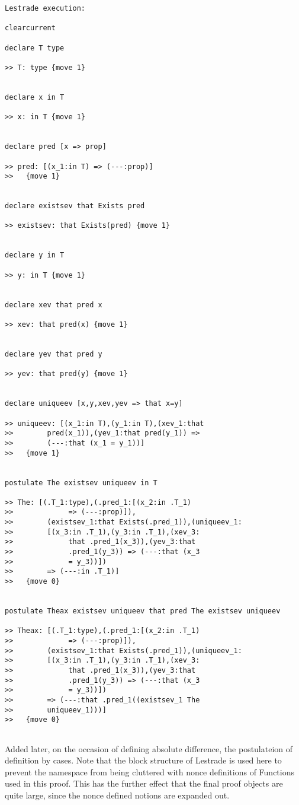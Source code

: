 \documentclass[12pt]{article}
\begin{document}
\begin{verbatim}Lestrade execution:

clearcurrent

declare T type

>> T: type {move 1}


declare x in T

>> x: in T {move 1}


declare pred [x => prop]

>> pred: [(x_1:in T) => (---:prop)]
>>   {move 1}


declare existsev that Exists pred

>> existsev: that Exists(pred) {move 1}


declare y in T

>> y: in T {move 1}


declare xev that pred x

>> xev: that pred(x) {move 1}


declare yev that pred y

>> yev: that pred(y) {move 1}


declare uniqueev [x,y,xev,yev => that x=y]

>> uniqueev: [(x_1:in T),(y_1:in T),(xev_1:that 
>>        pred(x_1)),(yev_1:that pred(y_1)) => 
>>        (---:that (x_1 = y_1))]
>>   {move 1}


postulate The existsev uniqueev in T

>> The: [(.T_1:type),(.pred_1:[(x_2:in .T_1) 
>>             => (---:prop)]),
>>        (existsev_1:that Exists(.pred_1)),(uniqueev_1:
>>        [(x_3:in .T_1),(y_3:in .T_1),(xev_3:
>>             that .pred_1(x_3)),(yev_3:that 
>>             .pred_1(y_3)) => (---:that (x_3 
>>             = y_3))])
>>        => (---:in .T_1)]
>>   {move 0}


postulate Theax existsev uniqueev that pred The existsev uniqueev

>> Theax: [(.T_1:type),(.pred_1:[(x_2:in .T_1) 
>>             => (---:prop)]),
>>        (existsev_1:that Exists(.pred_1)),(uniqueev_1:
>>        [(x_3:in .T_1),(y_3:in .T_1),(xev_3:
>>             that .pred_1(x_3)),(yev_3:that 
>>             .pred_1(y_3)) => (---:that (x_3 
>>             = y_3))])
>>        => (---:that .pred_1((existsev_1 The 
>>        uniqueev_1)))]
>>   {move 0}


\end{verbatim}

Added later, on the occasion of defining absolute difference, the postulateion of definition by cases.  Note that the block structure of Lestrade is used here
to prevent the namespace from being cluttered with nonce definitions of Functions used in this proof.  This has the further effect that the final proof objects
are quite large, since the nonce defined notions are expanded out.
\end{document}
